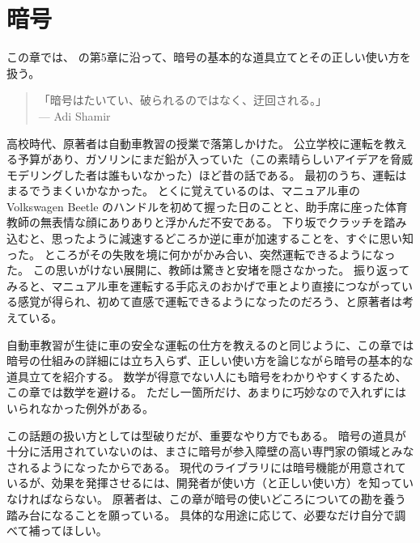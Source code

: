 \documentclass[uplatex]{jsarticle}
\begin{document}
\newpage

\section{暗号}

この章では、\cite{Kohnfelder2021} の第5章に沿って、暗号の基本的な道具立てとその正しい使い方を扱う。

\begin{quote}
「暗号はたいてい、破られるのではなく、迂回される。」\\
\hfill --- Adi Shamir
\end{quote}

高校時代、原著者は自動車教習の授業で落第しかけた。
公立学校に運転を教える予算があり、ガソリンにまだ鉛が入っていた（この素晴らしいアイデアを脅威モデリングした者は誰もいなかった）ほど昔の話である。
最初のうち、運転はまるでうまくいかなかった。
とくに覚えているのは、マニュアル車の Volkswagen Beetle のハンドルを初めて握った日のことと、助手席に座った体育教師の無表情な顔にありありと浮かんだ不安である。
下り坂でクラッチを踏み込むと、思ったように減速するどころか逆に車が加速することを、すぐに思い知った。
ところがその失敗を境に何かがかみ合い、突然運転できるようになった。
この思いがけない展開に、教師は驚きと安堵を隠さなかった。
振り返ってみると、マニュアル車を運転する手応えのおかげで車とより直接につながっている感覚が得られ、初めて直感で運転できるようになったのだろう、と原著者は考えている。

自動車教習が生徒に車の安全な運転の仕方を教えるのと同じように、この章では暗号の仕組みの詳細には立ち入らず、正しい使い方を論じながら暗号の基本的な道具立てを紹介する。
数学が得意でない人にも暗号をわかりやすくするため、この章では数学を避ける。
ただし一箇所だけ、あまりに巧妙なので入れずにはいられなかった例外がある。

この話題の扱い方としては型破りだが、重要なやり方でもある。
暗号の道具が十分に活用されていないのは、まさに暗号が参入障壁の高い専門家の領域とみなされるようになったからである。
現代のライブラリには暗号機能が用意されているが、効果を発揮させるには、開発者が使い方（と正しい使い方）を知っていなければならない。
原著者は、この章が暗号の使いどころについての勘を養う踏み台になることを願っている。
具体的な用途に応じて、必要なだけ自分で調べて補ってほしい。
\end{document}
